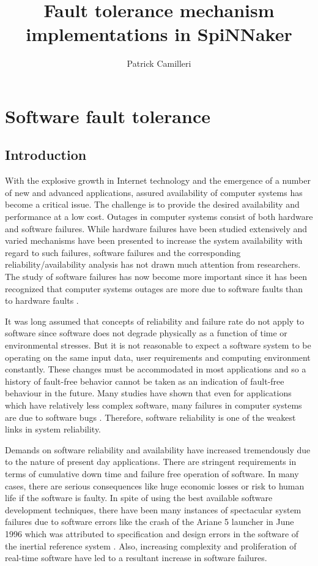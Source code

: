 \documentclass[a4paper, 11pt]{article}
\title{Fault tolerance mechanism implementations in SpiNNaker}
\author{Patrick Camilleri}
\date{}
\begin{document}
\maketitle

\tableofcontents

\newpage
\section{Software fault tolerance}
\subsection{Introduction}
With the explosive growth in Internet technology and the emergence of a number of new and advanced applications, assured availability of computer systems has become a critical issue. The challenge is to provide the desired availability and performance at a low cost.
Outages in computer systems consist of both hardware and software failures. While hardware failures have been studied extensively and varied mechanisms have been presented to increase the system availability with regard to such failures, software failures and the corresponding reliability/availability analysis has not drawn much attention from researchers. The study of software failures has now become more important since it has been recognized that computer systems outages are more due to software faults than to hardware faults \citep{gray1991high}.

It was long assumed that concepts of reliability and failure rate do not apply to software since software does not degrade physically as a function of time or environmental stresses. But it is not reasonable to expect a software system to be operating on the same input data, user requirements and computing environment constantly. These changes must be accommodated in most applications and so a history of fault-free behavior cannot be taken as an indication of fault-free behaviour in the future. Many studies have shown that even for applications which have relatively less complex software, many failures in computer systems are due to software bugs \citep{pradhan1996fault}. Therefore, software reliability is one of the weakest links in system reliability.

Demands on software reliability and availability have increased tremendously due to the nature of present day applications. There are stringent requirements in terms of cumulative down time and failure free operation of software. In many cases, there are serious consequences like huge economic losses or risk to human life if the software is faulty. In spite of using the best available software development techniques, there have been many instances of spectacular system failures due to software errors like the crash of the Ariane 5 launcher in June 1996 which was attributed to specification and design errors in the software of the inertial reference system \citep{lions1996ariane}. Also, increasing complexity and proliferation of real-time software have led to a resultant increase in software failures.
\end{document}
